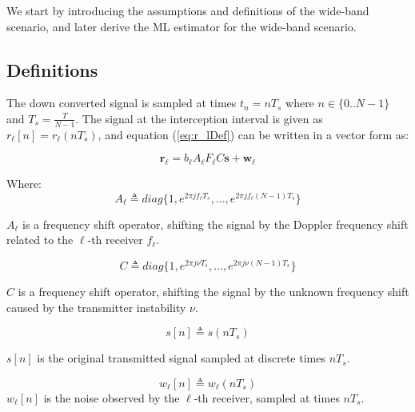 We start by introducing the assumptions and definitions of the wide-band scenario, and later derive the ML estimator for the wide-band scenario.

\subsection{Definitions}
The down converted signal is sampled at times $t_n=nT_s$ where $n\in\{0..N-1\}$ and $T_s =\frac{T}{N-1}$.
The signal at the interception interval is given as $r_\ell [n]=r_\ell (nT_s)$, and equation (\ref{eq:r_lDef}) can be written in a vector form as:

\begin{equation}
\label{eq:r_lWBDef}
\mathbf{r_\ell}=b_\ell A_\ell F_\ell C \mathbf{s} + \mathbf{w_\ell}
\end{equation}

Where:
\begin{equation}
A_\ell \triangleq diag\{1,e^{2 \pi j f_\ell  T_s},\dots,e^{2 \pi j f_\ell (N-1) T_s} \}                                                         
\end{equation}

$A_\ell$ is a frequency shift operator, shifting the signal by the Doppler frequency shift related to the $\ell$-th receiver $f_\ell$.

\begin{equation}
C \triangleq diag \{1  ,e^{2 \pi j \nu T_s},\dots,e^{2 \pi j \nu (N-1) T_s }\}                                                         
\end{equation}

$C$ is a frequency shift operator, shifting the signal by the unknown frequency shift caused by the transmitter instability $\nu$.

\begin{equation}
s[n] \triangleq s(nT_s)                                                                                                           
\end{equation}

$s[n]$ is the original transmitted signal sampled at discrete times $nT_s$.

\begin{equation}
w_\ell[n] \triangleq w_\ell(nT_s)                                                                                                        
\end{equation}
$w_\ell [n]$ is the noise observed by the $\ell$-th receiver, sampled at times $nT_s$.\\

